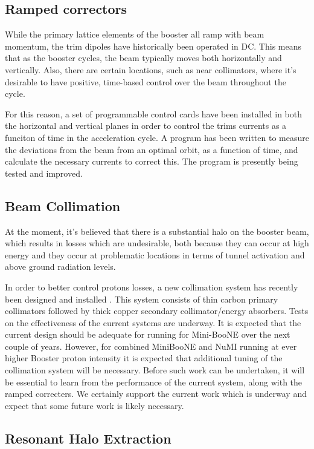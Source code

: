 \documentclass{article}
\begin{document}
\subsection {Ramped correctors}

While the primary lattice elements of the booster all ramp with
beam momentum, the trim dipoles have historically been operated in
DC.  This means that as the booster cycles, the beam typically
moves both horizontally and vertically.  Also, 
there are certain locations, such as near
collimators, where it's desirable to have positive, time-based
control over the beam throughout the cycle.

For this reason, a set of programmable control cards have been installed in both the
horizontal and vertical planes in order to control the trims currents as
a funciton of time in the acceleration cycle.  A program has been
written to measure the deviations from the beam from an optimal
orbit, as a function of time, and calculate the necessary currents
to correct this.  The program is presently being tested and improved.


\subsection {Beam Collimation}

At the moment, it's believed that there is a substantial halo on the booster
beam, which results in losses which are undesirable, both because they
can occur at high energy and they occur at problematic locations in
terms of tunnel activation and above ground radiation levels.  

In order to better control  protons losses, 
a new collimation system has recently been designed and installed
\cite {Drozhdin}. This system consists of thin carbon primary collimators 
followed by thick copper secondary collimator/energy absorbers. Tests on
the effectiveness of the current systems are underway. It is expected that
the current design should be adequate for running for Mini-BooNE over the
next couple of years. However, for combined MiniBooNE and NuMI running at
ever higher Booster proton intensity it is expected that additional tuning
of the collimation system will be necessary. Before such work can be
undertaken, it will be essential to learn from the performance of the current
system, along with the ramped correcters. We certainly support the current
work which is underway and expect that some future work is likely necessary.

\subsection {Resonant Halo Extraction}
\end{document}
